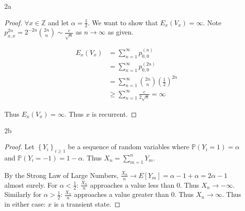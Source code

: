\documentclass{article}
\newcommand{\PR}{\mathbb{P}}
\newcommand{\Z}{\mathbb{Z}}
\begin{document}
\begin{PROB}{2a}\label{Problem 2a.}
\end{PROB}
\begin{proof}
    $\forall x \in \Z$ and let $\alpha = \frac{1}{2}$. We want to show that $E_x(V_x) = \infty$. Note $p_{x, x}^{2n} = 2^{-2n}{2n \choose n} \sim \frac{c}{\sqrt{n}}$ as $n \to \infty$ as given.   
    
    \begin{align*}
        E_x(V_x) &= \sum_{n = 1}^{\infty}p_{0, 0}^{(n)} \\
        &= \sum_{n = 1}^{\infty}p_{0, 0}^{(2n)} \\
        &= \sum_{n = 1}^{\infty}{2n \choose n}\left(\frac{1}{2}\right)^{2n} \\
        &\geq \sum_{n = 1}^{\infty} \frac{c}{2\sqrt{n}} = \infty
    \end{align*}

    Thus $E_x(V_x) = \infty$. Thus $x$ is recurrent.  
\end{proof}
\begin{PROB}{2b}\label{Problem 2b.}
\end{PROB}
\begin{proof}
    Let $\left\{ Y_i \right\}_{i \geq 1}$ be a sequence of random variables where $\PR(Y_i = 1) = \alpha$ and $\PR(Y_i = -1) = 1- \alpha$. Thus $X_n = \sum_{m = 1}^{n}Y_m$.
    
    By the Strong Law of Large Numbers, $\frac{X_n}{n} \to E[Y_m] = \alpha - 1  + \alpha = 2 \alpha - 1$ almost surely. For $\alpha < \frac{1}{2}$: $\frac{X_n}{n}$ approaches a value less than 0. Thus $X_n \to -\infty$. Similarly for $\alpha > \frac{1}{2}$: $\frac{X_n}{n}$ approaches a value greater than 0. Thus $X_n \to \infty$. Thus in either case: $x$ is a transient state.       
    
\end{proof}
\end{document}

